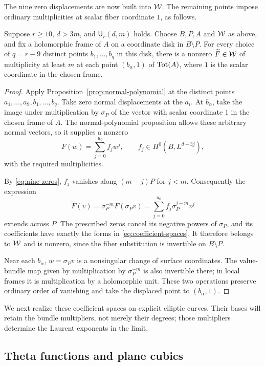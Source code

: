 The nine zero displacements are now built into $\mathcal W$. The remaining
points impose ordinary multiplicities at scalar fiber coordinate $1$,
as follows.

\begin{proposition}
\label{prop:necessary-W}
Suppose $r\geq10$, $d>3m$, and $\mathsf U_r(d,m)$ holds. Choose
$B,P,A$ and $\mathcal W$ as above, and fix a holomorphic frame of $A$ on
a coordinate disk in $B\setminus P$. For every choice of $q=r-9$
distinct points $b_1,\ldots,b_q$ in this disk, there is a nonzero
$\widetilde F\in\mathcal W$ of multiplicity at least $m$ at each point
$(b_\alpha,1)$ of $\operatorname{Tot}(A)$, where $1$ is the scalar coordinate in
the chosen frame.
\end{proposition}

\begin{proof}
Apply Proposition~\ref{prop:normal-polynomial} at the distinct points
$a_1,\ldots,a_9,b_1,\ldots,b_q$. Take zero normal displacements
at the $a_i$. At $b_\alpha$, take the image under multiplication by
$\sigma_P$ of the vector with scalar coordinate $1$ in the chosen
frame of $A$. The normal-polynomial proposition allows these arbitrary
normal vectors, so it supplies a nonzero
\[
 F(w)=\sum_{j=0}^{u_0}f_jw^j,\qquad
 f_j\in H^0(B,L^{d-3j}),
\]
with the required multiplicities.

By \eqref{eq:nine-zeros}, $f_j$ vanishes along $(m-j)P$ for $j<m$.
Consequently the expression
\[
 \widetilde F(v)=\sigma_P^{-m}F(\sigma_P v)
       =\sum_{j=0}^{u_0}f_j\sigma_P^{j-m}v^j
\]
extends across $P$. The prescribed zeros cancel its negative powers of
$\sigma_P$, and its coefficients have exactly the forms in
\eqref{eq:coefficient-spaces}. It therefore belongs to $\mathcal W$ and is
nonzero, since the fiber substitution is invertible on $B\setminus P$.

Near each $b_\alpha$, $w=\sigma_P v$ is a nonsingular change of
surface coordinates. The value-bundle map given by multiplication by
$\sigma_P^{-m}$ is also invertible there; in local frames it is
multiplication by a holomorphic unit. These two operations preserve
ordinary order of vanishing and take the displaced point to
$(b_\alpha,1)$.
\end{proof}

We next realize these coefficient spaces on explicit elliptic curves.
Their bases will retain the bundle multipliers, not merely their degrees;
those multipliers determine the Laurent exponents in the limit.

\subsection{Theta functions and plane cubics}

